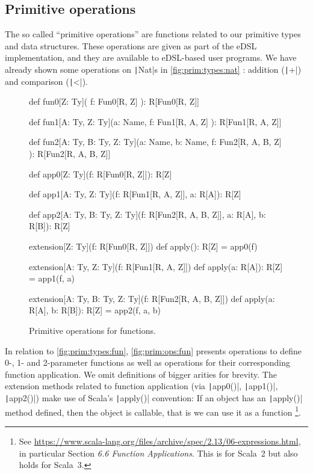 \documentclass[11pt]{article}
\renewcommand{\vref}[1]{\autoref{#1} \vpageref{#1}}{}
\newcommand{\ScalaI}[1]{\texttt|#1|}
\begin{document}
\subsection{Primitive operations}
\label{sec:prim:ops}
The so called ``primitive operations'' are functions related to our primitive 
types and data structures. These operations are given as part of the eDSL 
implementation, and they are available to eDSL-based user programs. We have 
already shown some operations on \ScalaI{Nat}s in \vref{fig:prim:types:nat}: 
addition (\ScalaI{+}) and comparison (\ScalaI{<}).

\begin{figure}[tb]
\begin{ScalaBlock}
def fun0[Z: Ty](
  f: Fun0[R, Z]
): R[Fun0[R, Z]]

def fun1[A: Ty, Z: Ty](a: Name,
  f: Fun1[R, A, Z]
): R[Fun1[R, A, Z]]

def fun2[A: Ty, B: Ty, Z: Ty](a: Name, b: Name,
  f: Fun2[R, A, B, Z]
): R[Fun2[R, A, B, Z]]

def app0[Z: Ty](f: R[Fun0[R, Z]]): R[Z]

def app1[A: Ty, Z: Ty](f: R[Fun1[R, A, Z]],
  a: R[A]): R[Z]

def app2[A: Ty, B: Ty, Z: Ty](f: R[Fun2[R, A, B, Z]],
  a: R[A], b: R[B]): R[Z]

extension[Z: Ty](f: R[Fun0[R, Z]])
  def apply(): R[Z] = app0(f)

extension[A: Ty, Z: Ty](f: R[Fun1[R, A, Z]])
  def apply(a: R[A]): R[Z] = app1(f, a)

extension[A: Ty, B: Ty, Z: Ty](f: R[Fun2[R, A, B, Z]])
  def apply(a: R[A], b: R[B]): R[Z] = app2(f, a, b)
\end{ScalaBlock}
\caption{Primitive operations for functions.}
\label{fig:prim:ops:fun}
\hrulefill
\end{figure}

In relation to \autoref{fig:prim:types:fun}, \vref{fig:prim:ops:fun} presents 
operations to define 0-, 1- and 2-parameter functions as well as operations 
for their corresponding function application. We omit definitions of bigger 
arities for brevity. The extension methods related to function application 
(via \ScalaI{app0()}, \ScalaI{app1()}, \ScalaI{app2()}) make use of Scala's 
\ScalaI{apply()} convention: If an object has an \ScalaI{apply()} method 
defined, then the object is callable, that is we can use it as a function%
\footnote{See 
\href{https://www.scala-lang.org/files/archive/spec/2.13/06-expressions.html}{https://www.scala-lang.org/files/archive/spec/2.13/06-expressions.html},
 in particular Section \textit{6.6 Function Applications}. This is for 
Scala~2 but also holds for Scala~3.}.
\end{document}
